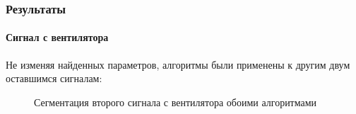 \documentclass[9pt]{beamer}
\begin{document}
\begin{frame}\frametitle{Результаты}
\framesubtitle{Сигнал с вентилятора}
Не изменяя найденных параметров, алгоритмы были применены к другим двум оставшимся сигналам:
\begin{figure}[h]
\begin{minipage}[h]{0.49\linewidth}
\end{minipage}
\begin{minipage}[h]{0.49\linewidth}
\end{minipage}
\caption{Сегментация второго сигнала с вентилятора обоими алгоритмами}
\end{figure}
\end{frame}
\end{document}
